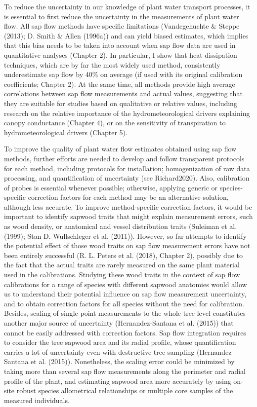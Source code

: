 \documentclass[11pt,twoside]{reedthesis}
\begin{document}
To reduce the uncertainty in our knowledge of plant water transport
processes, it is essential to first reduce the uncertainty in the
measurements of plant water flow. All sap flow methods have specific
limitations (Vandegehuchte \& Steppe (2013); D. Smith \& Allen (1996a))
and can yield biased estimates, which implies that this bias needs to be
taken into account when sap flow data are used in quantitative analyses
(Chapter 2). In particular, I show that heat dissipation techniques,
which are by far the most widely used method, consistently underestimate
sap flow by 40\% on average (if used with its original calibration
coefficients; Chapter 2). At the same time, all methods provide high
average correlations between sap flow measurements and actual values,
suggesting that they are suitable for studies based on qualitative or
relative values, including research on the relative importance of the
hydrometeorological drivers explaining canopy conductance (Chapter 4),
or on the sensitivity of transpiration to hydrometeorological drivers
(Chapter 5). \par

To improve the quality of plant water flow estimates obtained using sap
flow methods, further efforts are needed to develop and follow
transparent protocols for each method, including protocols for
installation; homogenization of raw data processing, and quantification
of uncertainty (see Richard2020). Also, calibration of probes is
essential whenever possible; otherwise, applying generic or
species-specific correction factors for each method may be an
alternative solution, although less accurate. To improve method-specific
correction factors, it would be important to identify sapwood traits
that might explain measurement errors, such as wood density, or
anatomical and vessel distribution traits (Suleiman et al. (1999); Stan
D. Wullschleger et al. (2011)). However, so far attempts to identify the
potential effect of those wood traits on sap flow measurement errors
have not been entirely successful (R. L. Peters et al. (2018), Chapter
2), possibly due to the fact that the actual traits are rarely measured
on the same plant material used in the calibrations. Studying these wood
traits in the context of sap flow calibrations for a range of species
with different sapwood anatomies would allow us to understand their
potential influence on sap flow measurement uncertainty, and to obtain
correction factors for all species without the need for calibration.
Besides, scaling of single-point measurements to the whole-tree level
constitutes another major source of uncertainty (Hernandez-Santana et
al. (2015)) that cannot be easily addressed with correction factors. Sap
flow integration requires to consider the tree sapwood area and its
radial profile, whose quantification carries a lot of uncertainty even
with destructive tree sampling (Hernandez-Santana et al. (2015)).
Nonetheless, the scaling error could be minimized by taking more than
several sap flow measurements along the perimeter and radial profile of
the plant, and estimating sapwood area more accurately by using on-site
robust species allometrical relationships or multiple core samples of
the measured individuals.\par
\end{document}
